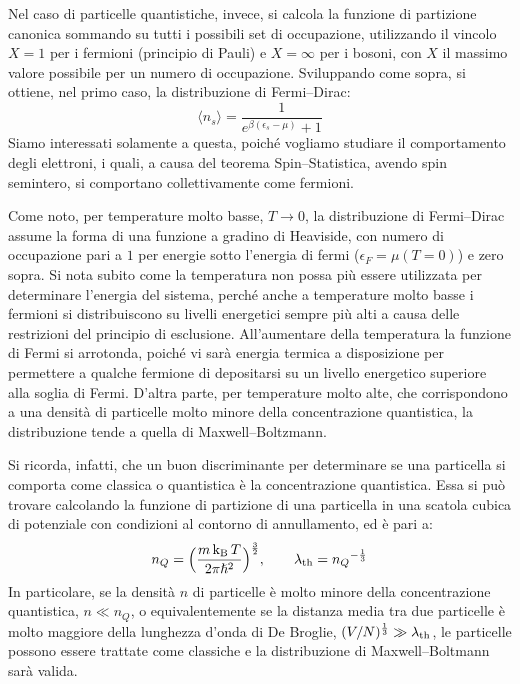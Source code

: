 Nel caso di particelle quantistiche, invece, si calcola la funzione di partizione canonica sommando su tutti i possibili set di occupazione, utilizzando il vincolo $X=1$ per i fermioni (principio di Pauli) e $X=\infty$ per i bosoni, con $X$ il massimo valore possibile per un numero di occupazione. Sviluppando come sopra, si ottiene, nel primo caso, la distribuzione di Fermi--Dirac:
\begin{equation}
    \langle n_s \rangle = \dfrac{1}{e^{\beta(\epsilon_s - \mu)} + 1}
\end{equation}
Siamo interessati solamente a questa, poiché vogliamo studiare il comportamento degli elettroni, i quali, a causa del teorema Spin--Statistica, avendo spin semintero, si comportano collettivamente come fermioni.

Come noto, per temperature molto basse, $T \to 0$, la distribuzione di Fermi--Dirac assume la forma di una funzione a gradino di Heaviside, con numero di occupazione pari a $1$ per energie sotto l'energia di fermi ($\epsilon_F = \mu(T=0)$) e zero sopra. Si nota subito come la temperatura non possa più essere utilizzata per determinare l'energia del sistema, perché anche a temperature molto basse i fermioni si distribuiscono su livelli energetici sempre più alti a causa delle restrizioni del principio di esclusione. All'aumentare della temperatura la funzione di Fermi si arrotonda, poiché vi sarà energia termica a disposizione per permettere a qualche fermione di depositarsi su un livello energetico superiore alla soglia di Fermi. D'altra parte, per temperature molto alte, che corrispondono a una densità di particelle molto minore della concentrazione quantistica, la distribuzione tende a quella di Maxwell--Boltzmann.

Si ricorda, infatti, che un buon discriminante per determinare se una particella si comporta come classica o quantistica è la concentrazione quantistica. Essa si può trovare calcolando la funzione di partizione di una particella in una scatola cubica di potenziale con condizioni al contorno di annullamento, ed è pari a:
\begin{equation}\label{eq:concentrazione-quantistica}
    n_Q = \Bigl( \dfrac{m \operatorname{k_B} T}{2 \pi {\hslash}^2}  \Bigr)^\frac{3}{2}, \qquad \lambda_\textup{th} = {n_Q}^{-\frac{1}{3}} 
\end{equation}
In particolare, se la densità $n$ di particelle è molto minore della concentrazione quantistica, $n \ll n_Q$, o equivalentemente se la distanza media tra due particelle è molto maggiore della lunghezza d'onda di De Broglie, $(V/N)^\frac{1}{3} \gg \lambda_\textup{th}$, le particelle possono essere trattate come classiche e la distribuzione di Maxwell--Boltmann sarà valida.

